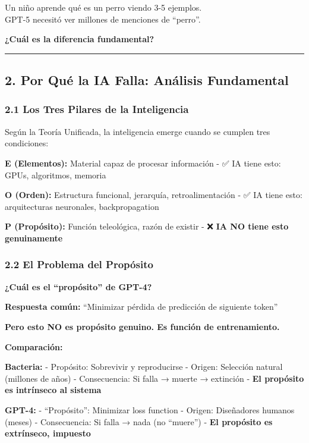 Un niño aprende qué es un perro viendo 3-5 ejemplos.\\
GPT-5 necesitó ver millones de menciones de ``perro''.

\textbf{¿Cuál es la diferencia fundamental?}

\begin{center}\rule{0.5\linewidth}{0.5pt}\end{center}

\subsection{2. Por Qué la IA Falla: Análisis
Fundamental}\label{por-quuxe9-la-ia-falla-anuxe1lisis-fundamental}

\subsubsection{2.1 Los Tres Pilares de la
Inteligencia}\label{los-tres-pilares-de-la-inteligencia}

Según la Teoría Unificada, la inteligencia emerge cuando se cumplen tres
condiciones:

\textbf{E (Elementos):} Material capaz de procesar información - ✅ IA
tiene esto: GPUs, algoritmos, memoria

\textbf{O (Orden):} Estructura funcional, jerarquía, retroalimentación -
✅ IA tiene esto: arquitecturas neuronales, backpropagation

\textbf{P (Propósito):} Función teleológica, razón de existir - ❌
\textbf{IA NO tiene esto genuinamente}

\subsubsection{2.2 El Problema del
Propósito}\label{el-problema-del-propuxf3sito}

\textbf{¿Cuál es el ``propósito'' de GPT-4?}

\textbf{Respuesta común:} ``Minimizar pérdida de predicción de siguiente
token''

\textbf{Pero esto NO es propósito genuino. Es función de entrenamiento.}

\textbf{Comparación:}

\textbf{Bacteria:} - Propósito: Sobrevivir y reproducirse - Origen:
Selección natural (millones de años) - Consecuencia: Si falla → muerte →
extinción - \textbf{El propósito es intrínseco al sistema}

\textbf{GPT-4:} - ``Propósito'': Minimizar loss function - Origen:
Diseñadores humanos (meses) - Consecuencia: Si falla → nada (no
``muere'') - \textbf{El propósito es extrínseco, impuesto}

